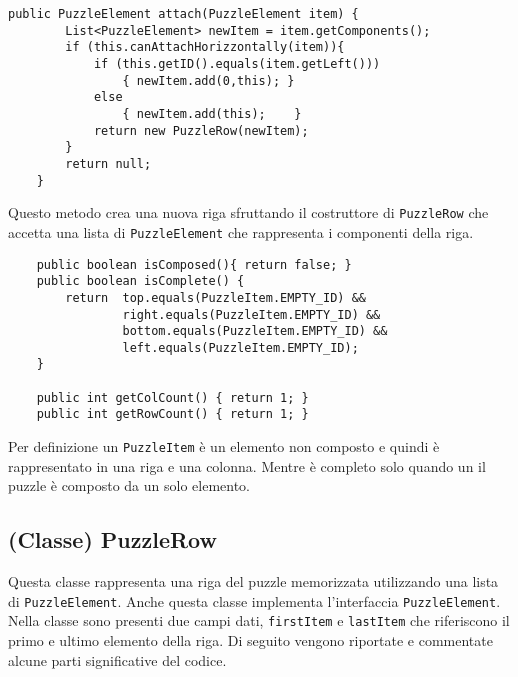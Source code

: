 \documentclass[a4paper, 11pt]{article}
\begin{document}
\begin{lstlisting}
public PuzzleElement attach(PuzzleElement item) {
		List<PuzzleElement> newItem = item.getComponents();
		if (this.canAttachHorizzontally(item)){
			if (this.getID().equals(item.getLeft()))
				{ newItem.add(0,this); }
			else
				{ newItem.add(this);	}
			return new PuzzleRow(newItem);
		}
		return null;
	}
\end{lstlisting}
Questo metodo crea una nuova riga sfruttando il costruttore di \texttt{PuzzleRow} che accetta una lista di \texttt{PuzzleElement} che rappresenta i componenti della riga.
\begin{lstlisting}
	public boolean isComposed(){ return false; }
	public boolean isComplete() {
		return 	top.equals(PuzzleItem.EMPTY_ID) &&
				right.equals(PuzzleItem.EMPTY_ID) &&
				bottom.equals(PuzzleItem.EMPTY_ID) &&
				left.equals(PuzzleItem.EMPTY_ID);
	}

	public int getColCount() { return 1; }
	public int getRowCount() { return 1; }

\end{lstlisting}
Per definizione un \texttt{PuzzleItem} è un elemento non composto e quindi è rappresentato in una riga e una colonna.
Mentre è completo solo quando un il puzzle è composto da un solo elemento.


\subsection{(Classe) PuzzleRow}

Questa classe rappresenta una riga del puzzle memorizzata utilizzando una lista di \texttt{PuzzleElement}.
Anche questa classe implementa l'interfaccia \texttt{PuzzleElement}.
Nella classe sono presenti due campi dati, \texttt{firstItem} e \texttt{lastItem} che riferiscono il primo e ultimo elemento della riga. 
Di seguito vengono riportate e commentate alcune parti significative del codice.
\end{document}
